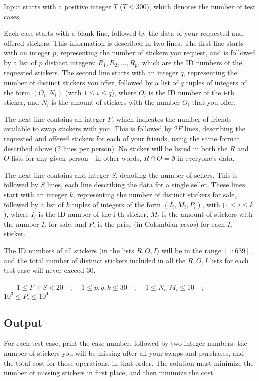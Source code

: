 Input starts with a positive integer $T$ ($T \leq 300$), which denotes
the number of test cases.

Each case starts with a blank line, followed by the data of your
requested and offered stickers. This information is described in two
lines. The first line starts with an integer $p$, representing the
number of stickers you request, and is followed by a list of $p$
distinct integers: $R_1, R_2, \ldots, R_p$, which are the ID numbers of
the requested stickers. The second line starts with an integer $q$,
representing the number of distinct stickers you offer, followed by a
list of $q$ tuples of integers of the form $(O_i,N_i)$ (with
$1 \leq i \leq q$), where $O_i$ is the ID number of the i-th sticker,
and $N_i$ is the amount of stickers with the number $O_i$ that you
offer.

The next line contains an integer $F$, which indicates the number of
friends available to swap stickers with you. This is followed by $2F$
lines, describing the requested and offered stickers for each of your
friends, using the same format described above (2 lines per person). No
sticker will be listed in both the $R$ and $O$ lists for any given
person---in other words, $R \cap O = \emptyset$ in everyone's data.

The next line contains and integer $S$, denoting the number of sellers.
This is followed by $S$ lines, each line describing the data for a
single seller. These lines start with an integer $k$, representing the
number of distinct stickers for sale, followed by a list of $k$ tuples
of integers of the form $(I_i,M_i,P_i)$, with ($1 \leq i \leq k$), where
$I_i$ is the ID number of the i-th sticker, $M_i$ is the amount of
stickers with the number $I_i$ for sale, and $P_i$ is the price (in
Colombian \emph{pesos}) for each $I_i$ sticker.

The ID numbers of all stickers (in the lists $R, O, I$) will be in the
range $[1:639]$, and the total number of distinct stickers included in
all the $R, O, I$ lists for each test case will never exceed 30.

~~~ $1 \leq F+S < 20$~~; ~~$1 \leq p, q, k \leq 30$~~;
~~$1 \leq N_i, M_i \leq 10$~~; ~~$10^3 \leq P_i \leq 10^4$

\subsection{Output}\label{output}

For each test case, print the case number, followed by two integer
numbers: the number of stickers you will be missing after all your swaps
and purchases, and the total cost for those operations, in that order.
The solution must minimize the number of missing stickers in first
place, and then minimize the cost.

